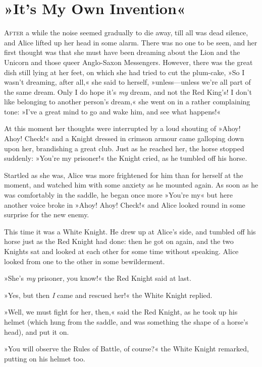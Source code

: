 \chapter{»It's My Own Invention«}

\lettrine[lines=4]{A}{fter} a while the noise seemed gradually to die away, till all was dead silence, and Alice lifted up her head in some alarm. There was no one to be seen, and her first thought was that she must have been dreaming about the Lion and the Unicorn and those queer Anglo-Saxon Messengers. However, there was the great dish still lying at her feet, on which she had tried to cut the plum-cake, »So I wasn't dreaming, after all,« she said to herself, »unless—unless we're all part of the same dream. Only I do hope it's \textit{my} dream, and not the Red King's! I don't like belonging to another person's dream,« she went on in a rather complaining tone: »I've a great mind to go and wake him, and see what happens!«

At this moment her thoughts were interrupted by a loud shouting of »Ahoy! Ahoy! Check!« and a Knight dressed in crimson armour came galloping down upon her, brandishing a great club. Just as he reached her, the horse stopped suddenly: »You're my prisoner!« the Knight cried, as he tumbled off his horse.

Startled as she was, Alice was more frightened for him than for herself at the moment, and watched him with some anxiety as he mounted again. As soon as he was comfortably in the saddle, he began once more »You're my\longdash« but here another voice broke in »Ahoy! Ahoy! Check!« and Alice looked round in some surprise for the new enemy.

This time it was a White Knight. He drew up at Alice's side, and tumbled off his horse just as the Red Knight had done: then he got on again, and the two Knights sat and looked at each other for some time without speaking. Alice looked from one to the other in some bewilderment.

»She's \textit{my} prisoner, you know!« the Red Knight said at last.

»Yes, but then \textit{I} came and rescued her!« the White Knight replied.

»Well, we must fight for her, then,« said the Red Knight, as he took up his helmet (which hung from the saddle, and was something the shape of a horse's head), and put it on.

»You will observe the Rules of Battle, of course?« the White Knight remarked, putting on his helmet too.

